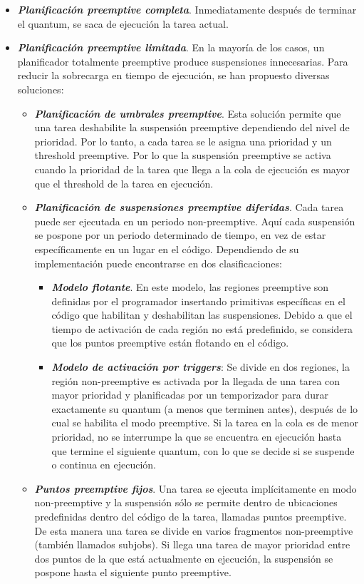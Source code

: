\begin{itemize}
\item \textbf{\textit{Planificación preemptive completa}}. Inmediatamente después de terminar el quantum, se saca de ejecución la tarea actual.
\item \textbf{\textit{Planificación preemptive limitada}}. En la mayoría de los casos, un planificador totalmente preemptive produce suspensiones innecesarias. Para reducir la sobrecarga en tiempo de ejecución, se han propuesto diversas soluciones\cite{Buttazzo2013}:
    \begin{itemize}
    \item \textbf{\textit{Planificación de umbrales preemptive}}.
Esta solución permite que una tarea deshabilite la suspensión preemptive dependiendo del nivel de prioridad. Por lo tanto, a cada tarea se le asigna una prioridad y un threshold preemptive. Por lo que la suspensión preemptive se activa cuando la prioridad de la tarea que llega a la cola de ejecución es mayor que el  threshold de la tarea en ejecución.
    \item \textbf{\textit{Planificación de suspensiones preemptive diferidas}}.
    Cada tarea puede ser ejecutada en un periodo non-preemptive. Aquí cada suspensión se pospone por un periodo determinado de tiempo, en vez de estar específicamente en un lugar en el código. Dependiendo de su implementación puede encontrarse en dos clasificaciones:
        \begin{itemize}
        \item \textbf{\textit{Modelo flotante}}. En este modelo, las regiones preemptive son definidas por el programador insertando primitivas específicas en el código que habilitan y deshabilitan las suspensiones. 
        Debido a que el tiempo de activación de cada región no está predefinido, se considera que los puntos preemptive están flotando en el código.
       
        \item \textbf{\textit{Modelo de activación por triggers}}: Se divide en dos regiones, la región non-preemptive es activada por la llegada de una tarea con mayor prioridad y planificadas por un temporizador para durar exactamente su quantum (a menos que terminen antes), después de lo cual se habilita el modo preemptive. Si la tarea en la cola es de menor prioridad, no se interrumpe la que se encuentra en ejecución hasta que termine el siguiente quantum, con lo que se decide si se suspende o continua en ejecución.
        \end{itemize}
    \item \textbf{\textit{Puntos preemptive fijos}}. Una tarea se ejecuta implícitamente en modo non-preemptive y la suspensión sólo se permite dentro de ubicaciones predefinidas dentro del código de la tarea, llamadas puntos preemptive. De esta manera una tarea se divide en varios fragmentos non-preemptive (también llamados subjobs). Si llega una tarea de mayor prioridad entre dos puntos de la que está actualmente en ejecución, la suspensión se pospone hasta el siguiente punto preemptive. 
    \end{itemize}
\end{itemize}


